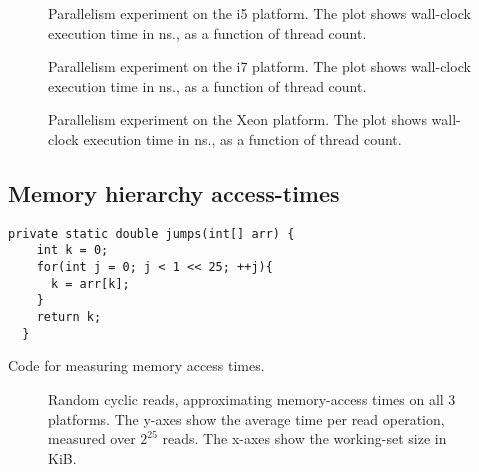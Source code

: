 \begin{figure}[hbpt]
\graphicspath{{plots/}}

	\caption{Parallelism experiment on the i5 platform. The plot shows
	wall-clock execution time in ns., as a function of thread count.}
	\label{fig:parallel-i5}
\end{figure}

\begin{figure}[hbpt]
\graphicspath{{plots/}}

	\caption{Parallelism experiment on the i7 platform. The plot shows
	wall-clock execution time in ns., as a function of thread count.}
	\label{fig:parallel-i7}
\end{figure}

\begin{figure}[hbpt]
\graphicspath{{plots/}}

	\caption{Parallelism experiment on the Xeon platform. The plot shows
	wall-clock execution time in ns., as a function of thread count.}
	\label{fig:parallel-xeon}
\end{figure}

\subsection{Memory hierarchy access-times}
\begin{code}
\begin{Verbatim}[frame=single]
  private static double jumps(int[] arr) {
    int k = 0;
    for(int j = 0; j < 1 << 25; ++j){
      k = arr[k];
    }
    return k;
  }
\end{Verbatim}
	\caption{Code for measuring memory access times.}
\end{code}

\begin{figure}[hbpt]
	\graphicspath{{plots/}}
	\begin{subfigure}{1\textwidth}
		
	\end{subfigure}
	\begin{subfigure}{1\textwidth}
		
	\end{subfigure}
	\begin{subfigure}{1\textwidth}
		
	\end{subfigure}
	\caption{Random cyclic reads, approximating memory-access times on all 3
	platforms. The y-axes show the average time per read operation, measured
	over $2^{25}$ reads. The x-axes show the working-set size in KiB.}
	\label{fig:readtimes}
\end{figure}

